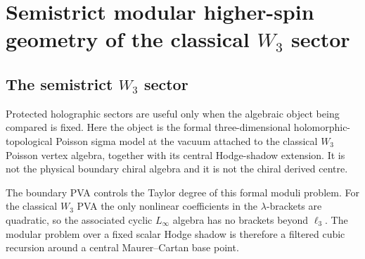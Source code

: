 
\chapter{Semistrict modular higher-spin geometry of the classical \texorpdfstring{$W_3$}{W3} sector}
\label{chap:semistrict-modular-W3}

\providecommand{\Bbbk}{\mathbb{k}}
\providecommand{\MC}{\operatorname{MC}}
\providecommand{\HS}{\operatorname{HS}}
\providecommand{\wt}{\operatorname{wt}}
\providecommand{\CE}{\operatorname{CE}}
\providecommand{\End}{\operatorname{End}}
\providecommand{\Hom}{\operatorname{Hom}}
\providecommand{\Bdy}{\operatorname{Bdy}}
\providecommand{\Defcyc}{\operatorname{Def}_{\mathrm{cyc}}}
\providecommand{\Sym}{\operatorname{Sym}}
\providecommand{\id}{\mathrm{id}}
\providecommand{\qc}{\mathrm{qc}}
\providecommand{\sh}{\mathrm{sh}}
\providecommand{\nc}{\mathrm{nc}}
\providecommand{\modu}{\mathrm{mod}}
\providecommand{\Lie}{\mathrm{Lie}}

\section{The semistrict \texorpdfstring{$W_3$}{W3} sector}
\label{sec:why-semistrict-modular-W3}

Protected holographic sectors are useful only when the algebraic
object being compared is fixed. Here the object is the formal
three-dimensional holomorphic-topological Poisson sigma model at the
vacuum attached to the classical $W_3$ Poisson vertex algebra, together
with its central Hodge-shadow extension. It is not the physical boundary
chiral algebra and it is not the chiral derived centre.

The boundary PVA controls the Taylor degree of this formal moduli
problem. For the classical $W_3$ PVA the only nonlinear coefficients in
the $\lambda$-brackets are quadratic, so the associated cyclic
$L_\infty$ algebra has no brackets beyond $\ell_3$. The modular problem
over a fixed scalar Hodge shadow is therefore a filtered cubic recursion
around a central Maurer--Cartan base point.

